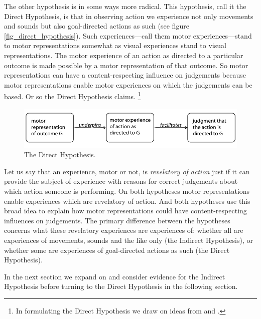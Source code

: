 \documentclass[12pt,\papersize]{extarticle}
\begin{document}
The other hypothesis is in some ways more radical.  This hypothesis, call it the Direct Hypothesis, is that in observing action we experience not only movements and sounds but also goal-directed actions as such (see figure \vref{fig_direct_hypothesis}). Such experiences---call them motor experiences---stand to motor representations somewhat as visual experiences stand to visual representations.  The motor experience of an action as directed to a particular outcome is made possible by a motor representation of that outcome.  So motor representations can have a content-respecting influence on judgements because motor representations enable motor experiences on which the judgements can be  based.  Or so the Direct Hypothesis claims.%
\footnote{
In formulating the Direct Hypothesis we draw on ideas from \citet{rizzolatti_mirrors_2008} and \citet{Jeannerod:1999kj}.
}

\begin{figure}
\begin{center}
\includegraphics[width=\textwidth]{fig_direct_hypothesis.png}
\caption{
\label{fig_direct_hypothesis}
	The Direct Hypothesis.
}
\end{center}
\end{figure}


Let us say that an experience, motor or not, is \emph{revelatory of action} just if it can provide the subject of experience with reasons for correct judgements about which action someone is performing. On both hypotheses motor representations enable experiences which are revelatory of action. And both hypotheses use this broad idea to explain how motor representations could have content-respecting influences on judgements. The primary difference between the hypotheses concerns what these revelatory experiences are experiences of: whether all are experiences of movements, sounds and the like only (the Indirect Hypothesis), or whether some are experiences of goal-directed actions as such (the Direct Hypothesis).  

In the next section we expand on and consider evidence for the Indirect Hypothesis before turning to the Direct Hypothesis in the following section.
\end{document}
